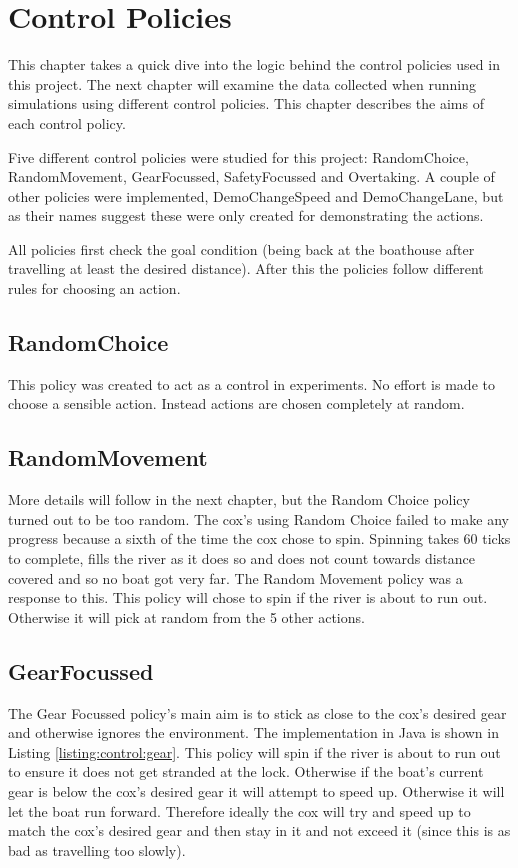 \chapter{Control Policies}

This chapter takes a quick dive into the logic behind the control policies used in this project. The next chapter will examine the data collected when running simulations using different control policies. This chapter describes the aims of each control policy.

Five different control policies were studied for this project: RandomChoice, RandomMovement, GearFocussed, SafetyFocussed and Overtaking. A couple of other policies were implemented, DemoChangeSpeed and DemoChangeLane, but as their names suggest these were only created for demonstrating the actions.

All policies first check the goal condition (being back at the boathouse after travelling at least the desired distance). After this the policies follow different rules for choosing an action.

\section{RandomChoice}
This policy was created to act as a control in experiments. No effort is made to choose a sensible action. Instead actions are chosen completely at random.

\section{RandomMovement}

More details will follow in the next chapter, but the Random Choice policy turned out to be too random. The cox's using Random Choice failed to make any progress because a sixth of the time the cox chose to spin. Spinning takes 60 ticks to complete, fills the river as it does so and does not count towards distance covered and so no boat got very far. The Random Movement policy was a response to this. This policy will chose to spin if the river is about to run out. Otherwise it will pick at random from the 5 other actions.

\section{GearFocussed}

The Gear Focussed policy's main aim is to stick as close to the cox's desired gear and otherwise ignores the environment. The implementation in Java is shown in Listing \ref{listing:control:gear}. This policy will spin if the river is about to run out to ensure it does not get stranded at the lock. Otherwise if the boat's current gear is below the cox's desired gear it will attempt to speed up. Otherwise it will let the boat run forward. Therefore ideally the cox will try and speed up to match the cox's desired gear and then stay in it and not exceed it (since this is as bad as travelling too slowly).

